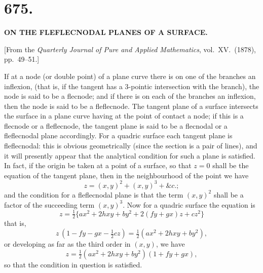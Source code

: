 \documentclass[11pt,a4paper]{article}
\begin{document}


\section*{675.}

\begin{center}
\textbf{ON THE FLEFLECNODAL PLANES OF A SURFACE.}
\end{center}

\medskip

\begin{center}
[From the \emph{Quarterly Journal of Pure and Applied Mathematics}, vol.~XV.\ (1878), pp.~49--51.]
\end{center}

\medskip

\noindent If at a node (or double point) of a plane curve there is on one of the branches an inflexion, (that is, if the tangent has a 3-pointic intersection with the branch), the node is said to be a flecnode; and if there is on each of the branches an inflexion, then the node is said to be a fleflecnode. The tangent plane of a surface intersects the surface in a plane curve having at the point of contact a node; if this is a flecnode or a fleflecnode, the tangent plane is said to be a flecnodal or a fleflecnodal plane accordingly. For a quadric surface each tangent plane is fleflecnodal: this is obvious geometrically (since the section is a pair of lines), and it will presently appear that the analytical condition for such a plane is satisfied. In fact, if the origin be taken at a point of a surface, so that $z = 0$ shall be the equation of the tangent plane, then in the neighbourhood of the point we have
\[
z = (x, y)^{2} + (x, y)^{3} + \&c.;
\]
and the condition for a fleflecnodal plane is that the term $(x, y)^{2}$ shall be a factor of the succeeding term $(x, y)^{3}$. Now for a quadric surface the equation is
\[
z = \tfrac{1}{2}\{a x^{2} + 2hxy + by^{2} + 2(fy + gx)z + cz^{2}\}
\]
that is,
\[
z\,(1 - fy - gx - \tfrac{1}{2}cz) = \tfrac{1}{2}(ax^{2} + 2hxy + by^{2}),
\]
or developing as far as the third order in $(x, y)$, we have
\[
z = \tfrac{1}{2}(ax^{2} + 2hxy + by^{2})(1 + fy + gx),
\]
so that the condition in question is satisfied.

\newpage

\end{document}
